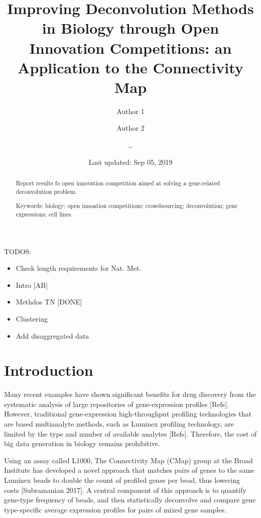 \documentclass[]{article}
\title{Improving Deconvolution Methods in Biology through Open Innovation
Competitions: an Application to the Connectivity Map}
\author{Author 1 \and Author 2 \and \ldots{}}
\date{Last updated: Sep 05, 2019}
\providecommand{\tightlist}{%
  \setlength{\itemsep}{0pt}\setlength{\parskip}{0pt}}
\begin{document}
\maketitle
\begin{abstract}
Report results fo open innovation competition aimed at solving a
gene-related deconvolution problem.


\smallskip\noindent 
Keywords: biology; open innoation competitions; crowdsourcing; deconvolution; gene expressions; cell lines.
\end{abstract}

{
\setcounter{tocdepth}{2}
\newpage
\tableofcontents
\newpage
}
\color{red}

TODOS:

\begin{itemize}
\tightlist
\item
  Check length requirements for Nat. Met.
\item
  Intro {[}AB{]}
\item
  Methdos TN {[}DONE{]}
\item
  Clustering
\item
  Add disaggregated data
\end{itemize}

\color{black}

\hypertarget{introduction}{%
\section{Introduction}\label{introduction}}

Many recent examples have shown significant benefits for drug discovery
from the systematic analysis of large repositories of gene-expression
profiles {[}Refs{]}. However, traditional gene-expression
high-throughput profiling technologies that are based multianalyte
methods, such as Luminex profiling technology, are limited by the type
and number of available analytes {[}Refs{]}. Therefore, the cost of big
data generation in biology remains prohibitive.

Using an assay called L1000, The Connectivity Map (CMap) group at the
Broad Institute has developed a novel approach that matches pairs of
genes to the same Luminex beads to double the count of profiled genes
per bead, thus lowering costs {[}Subramanian 2017{]}. A central
component of this approach is to quantify gene-type frequency of beads,
and then statistically deconvolve and compare gene type-specific average
expression profiles for pairs of mixed gene samples.
\end{document}
